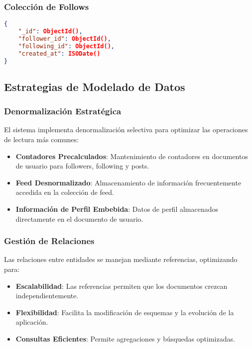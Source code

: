 \documentclass[12pt,letterpaper]{article}
\begin{document}
\subsubsection{Colección de Follows}
\begin{lstlisting}[language=json]
{
    "_id": ObjectId(),
    "follower_id": ObjectId(),
    "following_id": ObjectId(),
    "created_at": ISODate()
}
\end{lstlisting}

\subsection{Estrategias de Modelado de Datos}

\subsubsection{Denormalización Estratégica}
El sistema implementa denormalización selectiva para optimizar las operaciones de lectura más comunes:

\begin{itemize}
    \item \textbf{Contadores Precalculados}: Mantenimiento de contadores en documentos de usuario para followers, following y posts.
    \item \textbf{Feed Desnormalizado}: Almacenamiento de información frecuentemente accedida en la colección de feed.
    \item \textbf{Información de Perfil Embebida}: Datos de perfil almacenados directamente en el documento de usuario.
\end{itemize}

\subsubsection{Gestión de Relaciones}
Las relaciones entre entidades se manejan mediante referencias, optimizando para:

\begin{itemize}
    \item \textbf{Escalabilidad}: Las referencias permiten que los documentos crezcan independientemente.
    \item \textbf{Flexibilidad}: Facilita la modificación de esquemas y la evolución de la aplicación.
    \item \textbf{Consultas Eficientes}: Permite agregaciones y búsquedas optimizadas.
\end{itemize}
\end{document}
